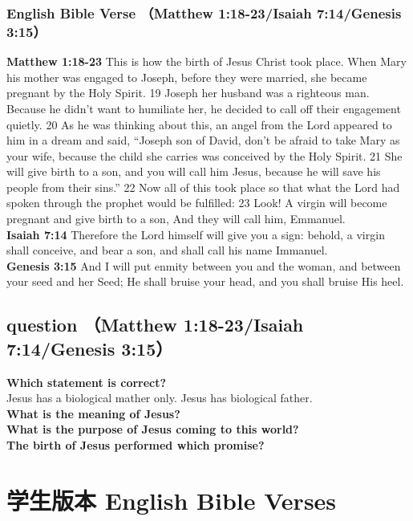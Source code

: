 \subsubsection{English Bible Verse （Matthew 1:18-23/Isaiah 7:14/Genesis 3:15）}
\textbf{Matthew 1:18-23} This is how the birth of Jesus Christ took place. When Mary his mother was engaged to Joseph, before they were married, she became pregnant by the Holy Spirit. 19 Joseph her husband was a righteous man. Because he didn’t want to humiliate her, he decided to call off their engagement quietly. 20 As he was thinking about this, an angel from the Lord appeared to him in a dream and said, “Joseph son of David, don’t be afraid to take Mary as your wife, because the child she carries was conceived by the Holy Spirit. 21 She will give birth to a son, and you will call him Jesus, because he will save his people from their sins.” 22 Now all of this took place so that what the Lord had spoken through the prophet would be fulfilled:
23 Look! A virgin will become pregnant and give birth to a son, And they will call him, Emmanuel.\\
\textbf{Isaiah 7:14} Therefore the Lord himself will give you a sign: behold, a virgin shall conceive, and bear a son, and shall call his name Immanuel.\\
\textbf{Genesis 3:15} And I will put enmity between you and the woman, and between your seed and her Seed; He shall bruise your head, and you shall bruise His heel.\\


\subsection{question （Matthew 1:18-23/Isaiah 7:14/Genesis 3:15）}
\textbf{Which statement is correct?}\\
Jesus has a biological mather only.    \hspace{1cm} Jesus has biological father. \\
\textbf{What is the meaning of Jesus?}\\
\textbf{What is the purpose of Jesus coming to this world?}\\
\textbf{The birth of Jesus performed which promise?}\\


\newpage
\section{学生版本 English Bible Verses}
